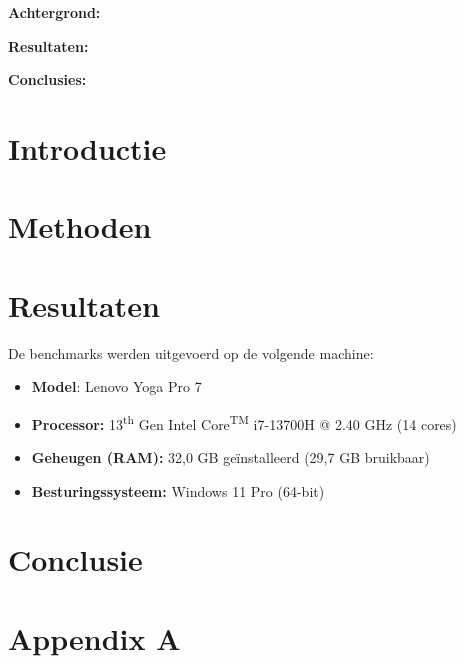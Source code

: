 \documentclass[12pt,a4paper,faculty=we,language=nl,doctype=article]{ugent-doc}
\renewcommand{\ULthickness}{2pt}
\begin{document}
	\maketitle
	\renewcommand{\ULthickness}{1pt}
	\begin{tcolorbox}[
		colback=white,
		colframe=cyan!70!black,
		boxrule=0.8pt,
		arc=3mm,
		title=\textbf{Abstract},
		fonttitle=\bfseries,
		coltitle=black,
		enhanced
		]
		\textbf{Achtergrond:}
		
		\textbf{Resultaten:}
		
		\textbf{Conclusies:} 
		
	\end{tcolorbox}
	
	\section{Introductie}
	
	\section{Methoden}
	
	
	\section{Resultaten}
	\begin{tcolorbox}[
		colback=white,
		colframe=cyan!70!black,
		boxrule=0.8pt,
		arc=3mm,
		title=\textbf{PC-specificaties},
		fonttitle=\bfseries,
		coltitle=black,
		enhanced
		]
		De benchmarks werden uitgevoerd op de volgende machine:
		
		\begin{itemize}
			\item \textbf{Model}: Lenovo Yoga Pro 7
			\item \textbf{Processor:} 13\textsuperscript{th} Gen Intel\textsuperscript{\textregistered} Core\textsuperscript{TM} i7-13700H @ 2.40 GHz (14 cores)
			\item \textbf{Geheugen (RAM):} 32,0 GB geïnstalleerd (29,7 GB bruikbaar)
			\item \textbf{Besturingssysteem:} Windows 11 Pro (64-bit)
		\end{itemize}
		
	\end{tcolorbox}
	
	
	\section{Conclusie}
	
	\section*{Appendix A}

	\nocite{openai2024chatgpt}
	\printbibliography
\end{document}
